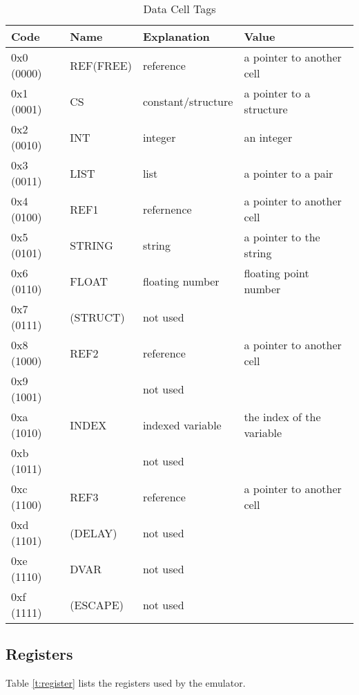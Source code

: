 \documentclass[11pt]{article}
\begin{document}
\begin{table}\centering
\begin{tabular}{l|l|l|l}
\hline
Code	   & Name	& Explanation	    & Value			\\
\hline
0x0 (0000) & REF(FREE)	& reference	    & a pointer to another cell \\
0x1 (0001) & CS		& constant/structure& a pointer to a structure	\\
0x2 (0010) & INT	& integer	    & an integer		\\
0x3 (0011) & LIST	& list		    & a pointer to a pair	\\
0x4 (0100) & REF1	& refernence	    & a pointer to another cell \\
0x5 (0101) & STRING	& string	    & a pointer to the string	\\
0x6 (0110) & FLOAT	& floating number   & floating point number	\\
0x7 (0111) & (STRUCT)	& not used	    &				\\
0x8 (1000) & REF2	& reference	    & a pointer to another cell \\
0x9 (1001) &		& not used	    &				\\
0xa (1010) & INDEX	& indexed variable  & the index of the variable	\\ 
0xb (1011) &		& not used 	    &				\\
0xc (1100) & REF3	& reference	    & a pointer to another cell \\
0xd (1101) & (DELAY)	& not used 	    &				\\
0xe (1110) & DVAR	& not used	    &                           \\
0xf (1111) & (ESCAPE)	& not used	    &				\\
\hline
\end{tabular}
\caption{Data Cell Tags}
\label{t:datatags}
\end{table}


\subsection{Registers}

Table \ref{t:register} lists the registers used by the emulator.
\end{document}
